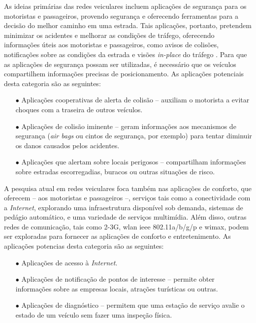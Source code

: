 As ideias primárias das redes veiculares incluem aplicações de segurança para
os motoristas e passageiros, provendo segurança e oferecendo ferramentas para a
decisão do melhor caminho em uma estrada. Tais aplicações, portanto, pretendem
minimizar os acidentes e melhorar as condições de tráfego, oferecendo informações
úteis aos motoristas e passageiros, como avisos de colisões, notificações
sobre as condições da estrada e visões \textit{in-place} do tráfego
\cite{moustafa2009vehicular}. Para que as aplicações de segurança possam ser
utilizadas, é necessário que os veículos compartilhem informações precisas de
posicionamento. As aplicações potenciais desta categoria são as seguintes:

\begin{enumerate}
 \item[$\bullet$] Aplicações cooperativas de alerta de colisão -- auxiliam o
 motorista a evitar choques com a traseira de outros veículos.
 \item[$\bullet$] Aplicações de colisão iminente -- geram informações aos
 mecanismos de segurança (\textit{air bags} ou cintos de segurança, por exemplo)
 para tentar diminuir os danos causados pelos acidentes.
 \item[$\bullet$] Aplicações que alertam sobre locais perigosos -- compartilham
 informações sobre estradas escorregadias, buracos ou outras situações de risco.
\end{enumerate}

A pesquisa atual em redes veiculares foca também nas aplicações de conforto,
que oferecem -- aos motoristas e passageiros --, serviços tais como a
conectividade com a \textit{Internet}, explorando uma infraestrutura disponível
sob demanda, sistemas de pedágio automático, e uma variedade de serviços
multimídia. Além disso, outras redes de comunicação, tais como 2-3G,
\gls{wlan}
\gls{ieee}
802.11a/b/g/p e \gls{wimax}, podem ser exploradas para fornecer as aplicações de conforto e
entretenimento. As aplicações potencias desta categoria são as seguintes:

\begin{enumerate}
 \item[$\bullet$] Aplicações de acesso à \textit{Internet}.
 \item[$\bullet$] Aplicações de notificação de pontos de interesse -- permite
 obter informações sobre as empresas locais, atrações turísticas ou outras.
 \item[$\bullet$] Aplicações de diagnóstico -- permitem que uma estação de
 serviço avalie o estado de um veículo sem fazer uma inspeção física.
\end{enumerate}

